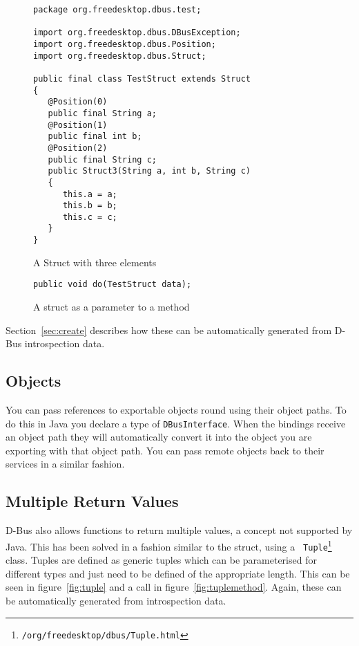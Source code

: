 \documentclass[a4paper,12pt]{article}
\begin{document}
\begin{figure}[htb]
\begin{center}
\begin{verbatim}
package org.freedesktop.dbus.test;

import org.freedesktop.dbus.DBusException;
import org.freedesktop.dbus.Position;
import org.freedesktop.dbus.Struct;

public final class TestStruct extends Struct
{
   @Position(0)
   public final String a;
   @Position(1)
   public final int b;
   @Position(2)
   public final String c;
   public Struct3(String a, int b, String c)
   {
      this.a = a;
      this.b = b;
      this.c = c;
   }
}
\end{verbatim}
\end{center}
\caption{A Struct with three elements}
\label{fig:struct}
\end{figure}

\begin{figure}[htb]
\begin{center}
\begin{verbatim}
public void do(TestStruct data);
\end{verbatim}
\end{center}
\caption{A struct as a parameter to a method}
\label{fig:structmethod}
\end{figure}


Section~\ref{sec:create} describes how these can be automatically
generated from D-Bus introspection data.

\subsection{Objects}

You can pass references to exportable objects round using their object paths.
To do this in Java you declare a type of {\tt DBusInterface}. When the bindings
receive an object path they will automatically convert it into the object you
are exporting with that object path. You can pass remote objects back to their
services in a similar fashion.


\subsection{Multiple Return Values}

D-Bus also allows functions to return multiple values, a concept not supported
by Java. This has been solved in a fashion similar to the struct, using a {\tt
Tuple\footnote{\javadocroot/org/freedesktop/dbus/Tuple.html}}
class. Tuples are defined as generic tuples which can be parameterised for
different types and just need to be defined of the appropriate length. This can
be seen in figure~\ref{fig:tuple} and a call in figure~\ref{fig:tuplemethod}.
Again, these can be automatically generated from introspection data.
\end{document}
